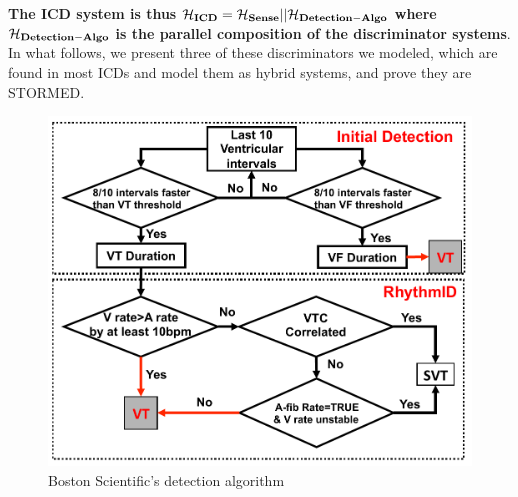 \textbf{The ICD system is thus 
$\mathbf{\mathcal{H}_{ICD} = \mathcal{H}_{Sense}||\mathcal{H}_{Detection-Algo}}$ where $\mathbf{\mathcal{H}_{Detection-Algo}}$ is the parallel composition of the discriminator systems}.
In what follows, we present three of these discriminators we modeled, which are found in most ICDs and model them as hybrid systems, and prove they are STORMED.
\begin{figure}[t]
	\centering
	\includegraphics[scale=0.4]{figures/BS_det_nosig}
	\vspace{-10pt}
	\caption{Boston Scientific's detection algorithm}
	\vspace{-10pt}
	\label{fig:bsc detection}
\end{figure}

